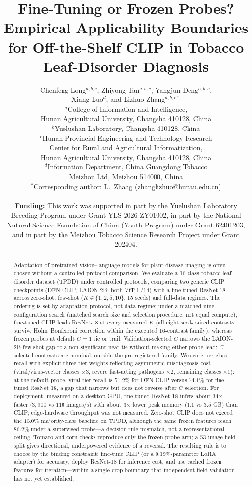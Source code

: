 \documentclass[10pt,a4paper]{article}
\title{Fine-Tuning or Frozen Probes? Empirical Applicability Boundaries for Off-the-Shelf CLIP in Tobacco Leaf-Disorder Diagnosis}
\author{
Chenfeng Long$^{a,b,c}$, Zhiyong Tan$^{a,b,c}$, Yangjun Deng$^{a,b,c}$,\\ Xiang Luo$^{d}$, and Lizhuo Zhang$^{a,b,c*}$\\[6pt]
$^{a}$College of Information and Intelligence,\\
\hspace{1em}Hunan Agricultural University, Changsha 410128, China\\
$^{b}$Yuelushan Laboratory, Changsha 410128, China\\
$^{c}$Hunan Provincial Engineering and Technology Research\\
\hspace{1em}Center for Rural and Agricultural Informatization,\\
\hspace{1em}Hunan Agricultural University, Changsha 410128, China\\
$^{d}$Information Department, China Guangdong Tobacco\\
\hspace{1em}Meizhou Ltd, Meizhou 514000, China\\[4pt]
$^{*}$Corresponding author: L.~Zhang (zhanglizhuo@hunau.edu.cn)\\[4pt]
\parbox{\dimexpr\hsize-2\tabcolsep\relax}{\sloppy\small\textbf{Funding:} This work was supported in part by the Yuelushan Laboratory Breeding Program under Grant YLS-2026-ZY01002, in part by the National Natural Science Foundation of China (Youth Program) under Grant 62401203, and in part by the Meizhou Tobacco Science Research Project under Grant 202404.}
}
\date{}
\begin{document}
\maketitle

\begin{abstract}
Adaptation of pretrained vision--language models for plant-disease imaging is often chosen without a controlled protocol comparison. We evaluate a 16-class tobacco leaf-disorder dataset (TPDD) under controlled protocols, comparing two generic CLIP checkpoints (DFN-CLIP, LAION-2B; both ViT-L/14) with a fine-tuned ResNet-18 across zero-shot, few-shot ($K\in\{1,2,5,10\}$, 15 seeds) and full-data regimes. The ordering is set by adaptation protocol, not data regime: under a matched nine-configuration search (matched search size and selection procedure, not equal compute), fine-tuned CLIP leads ResNet-18 at every measured $K$ (all eight seed-paired contrasts survive Holm--Bonferroni correction within the executed 16-contrast family), whereas frozen probes at default $C{=}1$ tie or trail. Validation-selected $C$ narrows the LAION-2B few-shot gap to a non-significant near-tie without making either probe lead; $C$-selected contrasts are nominal, outside the pre-registered family. We score per-class recall with explicit three-tier weights reflecting asymmetric misdiagnosis cost (viral/virus-vector classes $\times3$, severe fast-acting pathogens $\times2$, remaining classes $\times1$): at the default probe, viral-tier recall is $51.2\%$ for DFN-CLIP versus $74.1\%$ for fine-tuned ResNet-18, a gap that narrows but does not reverse after $C$ selection. For deployment, measured on a desktop GPU, fine-tuned ResNet-18 infers about 34$\times$ faster ($3{,}900$ vs $116$ images/s) with about 3$\times$ lower peak memory ($1.1$ vs $3.5$ GB) than CLIP; edge-hardware throughput was not measured. Zero-shot CLIP does not exceed the $13.0\%$ majority-class baseline on TPDD, although the same frozen features reach $86.2\%$ under a supervised probe---a decision-rule mismatch, not a representational ceiling. Tomato and corn checks reproduce only the frozen-probe arm; a 53-image field split gives directional, underpowered evidence of a reversal. The resulting rule is to choose by the binding constraint: fine-tune CLIP (or a 0.19\%-parameter LoRA adapter) for accuracy, deploy ResNet-18 for inference cost, and use cached frozen features for iteration---within a single-crop boundary that independent field validation has not yet established.
\end{abstract}
\end{document}
